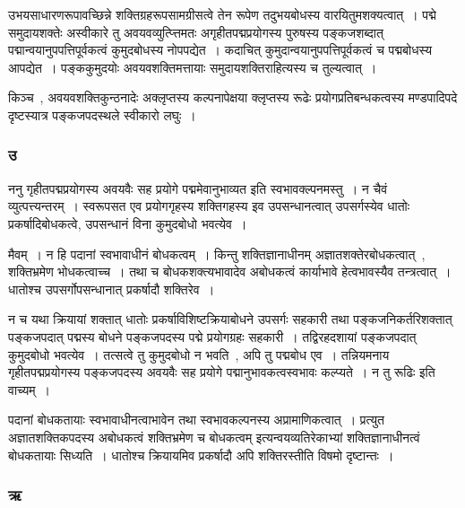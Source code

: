 				उभयसाधारणरूपावच्छिन्ने शक्तिग्रहरूपसामग्रीसत्वे तेन रूपेण तदुभयबोधस्य वारयितुमशक्यत्वात्~। पद्मे समुदायशक्तेः अस्वीकारे तु अवयवव्युत्प्त्तिमतः अगृहीतपद्मप्रयोगस्य पुरुषस्य पङ्कजशब्दात् पद्मान्वयानुपपत्तिपूर्वकत्वं  कुमुदबोधस्य नोपपद्येत~। कदाचित् कुमुदान्वयानुपपत्तिपूर्वकत्वं च पद्मबोधस्य आपद्येत~। पङ्ककुमुदयोः अवयवशक्तिमत्तायाः समुदायशक्तिराहित्यस्य च  तुल्यत्वात्~।

				किञ्च~, अवयवशक्तिकुन्ठनादेः अक्लृप्तस्य कल्पनापेक्षया क्लृप्तस्य रूढेः  प्रयोगप्रतिबन्धकत्वस्य मण्डपादिपदे दृष्टस्यात्र पङ्कजपदस्थले  स्वीकारो लघुः~।
			
			\subsubsection{उ}

				\begin{small}

					ननु गृहीतपद्मप्रयोगस्य अवयवैः सह प्रयोगे पद्ममेवानुभाव्यत इति स्वभावक्ल्पनमस्तु~। न चैवं व्युत्पत्त्यन्तरम्~। स्वरूपसत एव प्रयोगगृहस्य शक्तिगहस्य इव उपसन्धानत्वात् उपसर्गस्येव धातोः प्रकर्षादिबोधकत्वे, उपसन्धानं विना कुमुदबोधो भवत्येव~। 
					
					मैवम्~। न हि पदानां स्वभावाधीनं बोधकत्वम्~। किन्तु शक्तिज्ञानाधीनम् अज्ञातशक्तेरबोधकत्वात्~, शक्तिभ्रमेण भोधकत्वाच्च~। तथा च बोधकशक्त्यभावादेव अबोधकत्वं कार्याभावे हेत्वभावस्यैव तन्त्रत्वात्~। धातोश्च उपसर्गोपसन्धानात् प्रकर्षादौ शक्तिरेव~। 
				\end{small}

				न च यथा क्रियायां शक्तात् धातोः प्रकर्षाविशिष्टक्रियाबोधने उपसर्गः सहकारी तथा पङ्कजनिकर्तरिशक्तात् पङ्कजपदात् पद्मस्य बोधने  पङ्कजपदस्य पद्मे प्रयोगग्रहः सहकारी~। तद्विरहदशायां पङ्कजपदात् कुमुदबोधो भवत्येव~। तत्सत्वे तु कुमुदबोधो न भवति~, अपि तु पद्मबोध एव~। तन्नियमनाय गृहीतपद्मप्रयोगस्य पङ्कजपदस्य अवयवैः सह प्रयोगे पद्मानुभावकत्वस्वभावः कल्प्यते~। न तु रूढिः इति वाच्यम्~।

				पदानां बोधकतायाः स्वभावाधीनत्वाभावेन तथा स्वभावकल्पनस्य अप्रामाणिकत्वात्~। प्रत्युत अज्ञातशक्तिकपदस्य अबोधकत्वं शक्तिभ्रमेण च बोधकत्वम् इत्यन्वयव्यतिरेकाभ्यां  शक्तिज्ञानाधीनत्वं बोधकतायाः सिध्यति~। धातोश्च क्रियायमिव प्रकर्षादौ अपि शक्तिरस्तीति विषमो दृष्टान्तः~।

			\subsubsection{ऋ}

